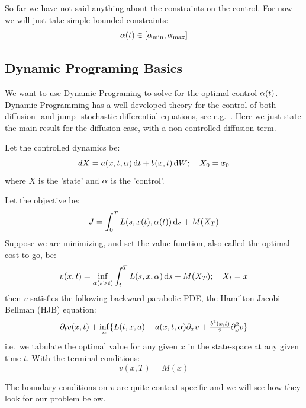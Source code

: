\documentclass{article}
\begin{document}

So far we have not said anything about the constraints on the control. For now
we will just take simple bounded constraints:
\begin{equation}
{\alpha}(t) \in [{ {\alpha}_{\textrm{min}} }, { {\alpha}_{\textrm{max}} }]
\label{eq:bound_constraints_alpha}
\end{equation}

\subsection{Dynamic Programing Basics}
We want to use Dynamic Programing to solve for the optimal control ${\alpha}(t)$.
Dynamic Programming has a well-developed theory for the control of both
diffusion- and jump- stochastic differential equations, see e.g.\
\cite{Hanson2007,Øksendal2005}. Here we just state the main result for
the diffusion case, with a non-controlled diffusion term.

Let the controlled dynamics be:
\begin{equation}
dX = a(x,t, {\alpha}) \, \mathrm{d} t + b(x,t)\, \mathrm{d} W; \quad X_0 = x_0
\end{equation} 
where $X$ is the 'state' and ${\alpha}$ is the 'control'. 

Let the objective be:
\begin{equation}
J = \int_0^T L(s,x(t),{\alpha}(t)) \, \mathrm{d} s + M(X_T)
\end{equation} 
Suppose we are minimizing, and set the value function, also called the
optimal cost-to-go, be:
\begin{equation}
v(x,t) = \inf_{{\alpha}(s>t)} \int_t^T L(s,x,{\alpha}) \, \mathrm{d} s + M(X_T); \quad X_t = x
\end{equation}
then $v$ satisfies the following  backward parabolic PDE, the
Hamilton-Jacobi-Bellman (HJB) equation:
\begin{equation}
{\partial}_t v(x,t) + \inf_{{\alpha}}  \{ L(t,x,a)  + a(x,t,{\alpha}){\partial}_x v + \tfrac{b^2(x,t)}{2}
{\partial}^2_x v \}
\end{equation}
i.e.\ we tabulate the optimal value for any given $x$ in the state-space at any
given time $t$. With the terminal conditions:
\begin{equation}
v(x,T) = M(x)
\end{equation}

The boundary conditions on $v$ are quite context-specific and we will see how
they look for our problem below.
\end{document}
